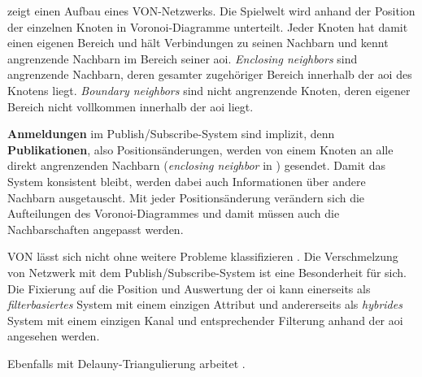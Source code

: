  zeigt einen Aufbau eines VON-Netzwerks. Die Spielwelt wird anhand der Position der einzelnen Knoten in Voronoi-Diagramme unterteilt. Jeder Knoten hat damit einen eigenen Bereich und hält Verbindungen zu seinen Nachbarn und kennt angrenzende Nachbarn im Bereich seiner \ac{aoi}. \emph{Enclosing neighbors} sind angrenzende Nachbarn, deren gesamter zugehöriger Bereich innerhalb der \ac{aoi} des Knotens liegt. \emph{Boundary neighbors} sind nicht angrenzende Knoten, deren eigener Bereich nicht vollkommen innerhalb der \ac{aoi} liegt.

\textbf{Anmeldungen} im Publish/Subscribe-System sind implizit, denn \textbf{Publikationen}, also Positionsänderungen, werden von einem Knoten an alle direkt angrenzenden Nachbarn (\emph{enclosing neighbor} in ) gesendet. Damit das System konsistent bleibt, werden dabei auch Informationen über andere Nachbarn ausgetauscht. Mit jeder Positionsänderung verändern sich die Aufteilungen des Voronoi-Diagrammes und damit müssen auch die Nachbarschaften angepasst werden.

VON lässt sich nicht ohne weitere Probleme klassifizieren . Die Verschmelzung von Netzwerk mit dem Publish/Subscribe-System ist eine Besonderheit für sich. Die Fixierung auf die Position und Auswertung der \ac{oi} kann einerseits als \emph{filterbasiertes} System mit einem einzigen Attribut und andererseits als \emph{hybrides} System mit einem einzigen Kanal und entsprechender Filterung anhand der \ac{aoi}  angesehen werden.


Ebenfalls mit Delauny-Triangulierung arbeitet \cite{Liebeherr2002Applicationlayer}.
